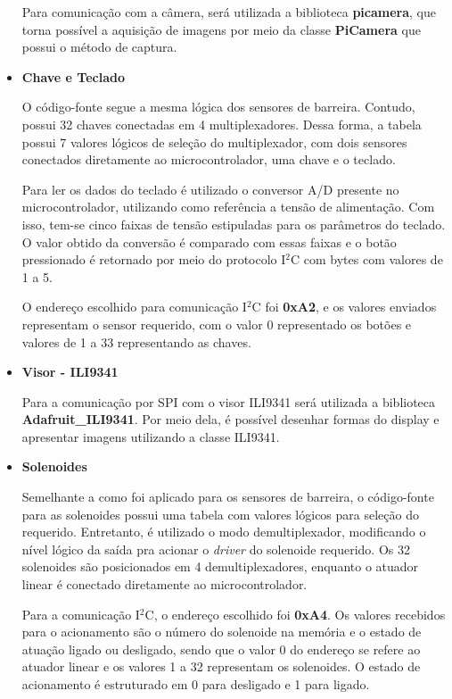 \begin{itemize}
    Para comunicação com a câmera, será utilizada a biblioteca \textbf{picamera}, que torna possível a aquisição de imagens por meio da classe \textbf{PiCamera} que possui o método de captura.
    
    \item \textbf{Chave e Teclado}
    
    O código-fonte segue a mesma lógica dos sensores de barreira. Contudo, possui 32 chaves conectadas em 4 multiplexadores. Dessa forma, a tabela possui 7 valores lógicos de seleção do multiplexador, com dois sensores conectados diretamente ao microcontrolador, uma chave e o teclado.
    
    Para ler os dados do teclado é utilizado o conversor A/D presente no microcontrolador, utilizando como referência a tensão de alimentação. Com isso, tem-se cinco faixas de tensão estipuladas para os parâmetros do teclado. O valor obtido da conversão é comparado com essas faixas e o botão pressionado é retornado por meio do protocolo I$^2$C com bytes com valores de 1 a 5.
    
    O endereço escolhido para comunicação I$^2$C foi \textbf{0xA2}, e os valores enviados representam o sensor requerido, com o valor 0 representado os botões e valores de 1 a 33 representando as chaves.
    
    \item \textbf{Visor - ILI9341}
    
    Para a comunicação por SPI com o visor ILI9341 será utilizada a biblioteca \textbf{Adafruit\_ILI9341}. Por meio dela, é possível desenhar formas do display e apresentar imagens utilizando a classe ILI9341.
    
    \item \textbf{Solenoides}
    
    Semelhante a como foi aplicado para os sensores de barreira, o código-fonte para as solenoides possui uma tabela com valores lógicos para seleção do requerido. Entretanto, é utilizado o modo demultiplexador, modificando o nível lógico da saída pra acionar o \textit{driver} do solenoide requerido. Os 32 solenoides são posicionados em 4 demultiplexadores, enquanto o atuador linear é conectado diretamente ao microcontrolador.
    
    Para a comunicação I$^2$C, o endereço escolhido foi \textbf{0xA4}. Os valores recebidos para o acionamento são o número do solenoide na memória e o estado de atuação ligado ou desligado, sendo que o valor 0 do endereço se refere ao atuador linear e os valores 1 a 32 representam os solenoides. O estado de acionamento é estruturado em 0 para desligado e 1 para ligado.
    

\end{itemize}
